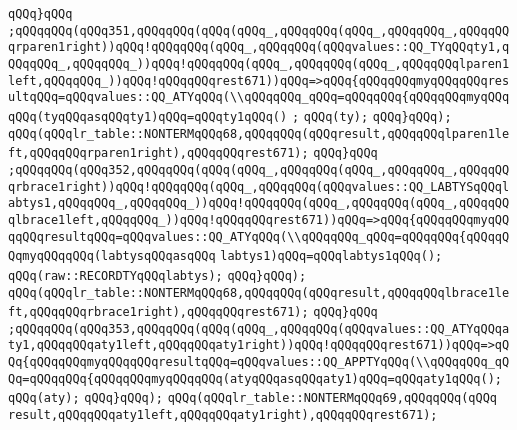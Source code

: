 \verb|qQQq}qQQq|\newline
\verb|;qQQqqQQq(qQQq351,qQQqqQQq(qQQq(qQQq_,qQQqqQQq(qQQq_,qQQqqQQq_,qQQqqQQqrparen1right))qQQq!qQQqqQQq(qQQq_,qQQqqQQq(qQQqvalues::QQ_TYqQQqty1,qQQqqQQq_,qQQqqQQq_))qQQq!qQQqqQQq(qQQq_,qQQqqQQq(qQQq_,qQQqqQQqlparen1left,qQQqqQQq_))qQQq!qQQqqQQqrest671))qQQq=>qQQq{qQQqqQQqmyqQQqqQQqresultqQQq=qQQqvalues::QQ_ATYqQQq(\\qQQqqQQq_qQQq=qQQqqQQq{qQQqqQQqmyqQQqqQQq(tyqQQqasqQQqty1)qQQq=qQQqty1qQQq()|\newline
\verb|;|\newline
\verb|qQQq(ty);|\newline
\verb|qQQq}qQQq);|\newline
\verb|qQQq(qQQqlr_table::NONTERMqQQq68,qQQqqQQq(qQQqresult,qQQqqQQqlparen1left,qQQqqQQqrparen1right),qQQqqQQqrest671);|\newline
\verb|qQQq}qQQq|\newline
\verb|;qQQqqQQq(qQQq352,qQQqqQQq(qQQq(qQQq_,qQQqqQQq(qQQq_,qQQqqQQq_,qQQqqQQqrbrace1right))qQQq!qQQqqQQq(qQQq_,qQQqqQQq(qQQqvalues::QQ_LABTYSqQQqlabtys1,qQQqqQQq_,qQQqqQQq_))qQQq!qQQqqQQq(qQQq_,qQQqqQQq(qQQq_,qQQqqQQqlbrace1left,qQQqqQQq_))qQQq!qQQqqQQqrest671))qQQq=>qQQq{qQQqqQQqmyqQQqqQQqresultqQQq=qQQqvalues::QQ_ATYqQQq(\\qQQqqQQq_qQQq=qQQqqQQq{qQQqqQQqmyqQQqqQQq(labtysqQQqasqQQq|\newline
\verb|labtys1)qQQq=qQQqlabtys1qQQq();|\newline
\verb|qQQq(raw::RECORDTYqQQqlabtys);|\newline
\verb|qQQq}qQQq);|\newline
\verb|qQQq(qQQqlr_table::NONTERMqQQq68,qQQqqQQq(qQQqresult,qQQqqQQqlbrace1left,qQQqqQQqrbrace1right),qQQqqQQqrest671);|\newline
\verb|qQQq}qQQq|\newline
\verb|;qQQqqQQq(qQQq353,qQQqqQQq(qQQq(qQQq_,qQQqqQQq(qQQqvalues::QQ_ATYqQQqaty1,qQQqqQQqaty1left,qQQqqQQqaty1right))qQQq!qQQqqQQqrest671))qQQq=>qQQq{qQQqqQQqmyqQQqqQQqresultqQQq=qQQqvalues::QQ_APPTYqQQq(\\qQQqqQQq_qQQq=qQQqqQQq{qQQqqQQqmyqQQqqQQq(atyqQQqasqQQqaty1)qQQq=qQQqaty1qQQq();|\newline
\verb|qQQq(aty);|\newline
\verb|qQQq}qQQq);|\newline
\verb|qQQq(qQQqlr_table::NONTERMqQQq69,qQQqqQQq(qQQq|\newline
\verb|result,qQQqqQQqaty1left,qQQqqQQqaty1right),qQQqqQQqrest671);|\newline

